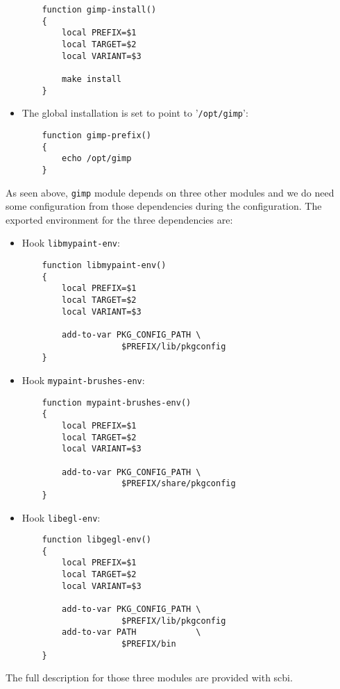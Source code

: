 \documentclass[a4paper,12pt,twoside]{article}
\newcommand{\code}[1]{\texttt{#1}}
\newcommand{\file}[1]{'{\texttt{#1}}'}
\begin{document}
\begin{itemize}
	\begin{lstlisting}
	function gimp-install()
	{
		local PREFIX=$1
		local TARGET=$2
		local VARIANT=$3

		make install
	}
	\end{lstlisting}

	\item The global installation is set to point to \file{/opt/gimp}:

	\begin{lstlisting}
	function gimp-prefix()
	{
		echo /opt/gimp
	}
	\end{lstlisting}

\end{itemize}

As seen above, \code{gimp} module depends on three other modules and we do need some configuration from those dependencies during the configuration. The exported environment for the three dependencies are:

\begin{itemize}
	\item Hook \code{libmypaint-env}:

	\begin{lstlisting}
	function libmypaint-env()
	{
		local PREFIX=$1
		local TARGET=$2
		local VARIANT=$3

		add-to-var PKG_CONFIG_PATH \
					$PREFIX/lib/pkgconfig
	}
	\end{lstlisting}

	\item Hook \code{mypaint-brushes-env}:

	\begin{lstlisting}
	function mypaint-brushes-env()
	{
		local PREFIX=$1
		local TARGET=$2
		local VARIANT=$3

		add-to-var PKG_CONFIG_PATH \
					$PREFIX/share/pkgconfig
	}
	\end{lstlisting}

	\item Hook \code{libegl-env}:

	\begin{lstlisting}
	function libgegl-env()
	{
		local PREFIX=$1
		local TARGET=$2
		local VARIANT=$3

		add-to-var PKG_CONFIG_PATH \
					$PREFIX/lib/pkgconfig
		add-to-var PATH            \
					$PREFIX/bin
	}
	\end{lstlisting}

\end{itemize}

The full description for those three modules are provided with scbi.
\end{document}
